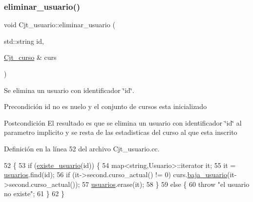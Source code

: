 \subsubsection{\texorpdfstring{eliminar\+\_\+usuario()}{eliminar\_usuario()}}
{\footnotesize\ttfamily void Cjt\+\_\+usuario\+::eliminar\+\_\+usuario (\begin{DoxyParamCaption}\item[{std\+::string}]{id,  }\item[{\mbox{\hyperlink{class_cjt__curso}{Cjt\+\_\+curso}} \&}]{curs }\end{DoxyParamCaption})}



Se elimina un usuario con identificador \char`\"{}id\char`\"{}. 

\begin{DoxyPrecond}{Precondición}
id no es nuelo y el conjunto de cursos esta inicializado 
\end{DoxyPrecond}
\begin{DoxyPostcond}{Postcondición}
El resultado es que se elimina un usuario con identificador \char`\"{}id\char`\"{} al parametro implicito y se resta de las estadisticas del curso al que esta inscrito 
\end{DoxyPostcond}


Definición en la línea 52 del archivo Cjt\+\_\+usuario.\+cc.


\begin{DoxyCode}
52                                                              \{
53   \textcolor{keywordflow}{if} (\mbox{\hyperlink{class_cjt__usuario_a2d4478e6b967659040f5a0b86b665204}{existe\_usuario}}(\textcolor{keywordtype}{id})) \{
54     map<string,Usuario>::iterator it;
55     it = \mbox{\hyperlink{class_cjt__usuario_af814d06f1c52bc2e744d253d20ce6e6b}{usuarios}}.find(\textcolor{keywordtype}{id});
56     \textcolor{keywordflow}{if} (it->second.curso\_actual() != 0) curs.\mbox{\hyperlink{class_cjt__curso_a7d41a4d58689e02f10093b56fce7947b}{baja\_usuario}}(it->second.curso\_actual());
57     \mbox{\hyperlink{class_cjt__usuario_af814d06f1c52bc2e744d253d20ce6e6b}{usuarios}}.erase(it);
58   \}
59   \textcolor{keywordflow}{else} \{
60     \textcolor{keywordflow}{throw} \textcolor{stringliteral}{"el usuario no existe"};
61   \}
62 \}
\end{DoxyCode}
\mbox{\label{class_cjt__usuario_a3f4be6c8f5568ef3767bf343418e6f5d}} 
